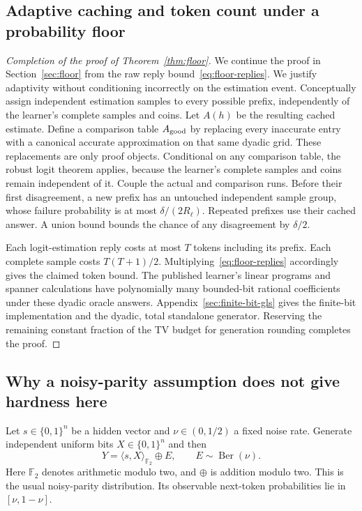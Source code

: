 \documentclass[11pt]{article}
\newcommand{\Ber}{\operatorname{Ber}}
\theoremstyle{definition}
\theoremstyle{remark}
\begin{document}
\subsection{Adaptive caching and token count under a probability floor}\label{sec:floor-completion}

\begin{proof}[Completion of the proof of Theorem~\ref{thm:floor}]
We continue the proof in Section~\ref{sec:floor} from the raw reply bound~\eqref{eq:floor-replies}.
We justify adaptivity without conditioning incorrectly on the estimation event. Conceptually assign independent estimation samples to every possible prefix, independently of the learner's complete samples and coins. Let $A(h)$ be the resulting cached estimate. Define a comparison table $A_{\rm good}$ by replacing every inaccurate entry with a canonical accurate approximation on that same dyadic grid. These replacements are only proof objects. Conditional on any comparison table, the robust logit theorem applies, because the learner's complete samples and coins remain independent of it. Couple the actual and comparison runs. Before their first disagreement, a new prefix has an untouched independent sample group, whose failure probability is at most $\delta/(2R_\ell)$. Repeated prefixes use their cached answer. A union bound bounds the chance of any disagreement by $\delta/2$.

Each logit-estimation reply costs at most $T$ tokens including its prefix. Each complete sample costs $T(T+1)/2$. Multiplying~\eqref{eq:floor-replies} accordingly gives the claimed token bound. The published learner's linear programs and spanner calculations have polynomially many bounded-bit rational coefficients under these dyadic oracle answers. Appendix~\ref{sec:finite-bit-gls} gives the finite-bit implementation and the dyadic, total standalone generator. Reserving the remaining constant fraction of the TV budget for generation rounding completes the proof.
\end{proof}

\subsection{Why a noisy-parity assumption does not give hardness here}\label{sec:parity}

Let $s\in\{0,1\}^n$ be a hidden vector and $\nu\in(0,1/2)$ a fixed noise rate. Generate independent uniform bits $X\in\{0,1\}^n$ and then
\[
Y=\langle s,X\rangle_{\mathbb F_2}\oplus E,
\qquad E\sim\Ber(\nu).
\]
Here $\mathbb F_2$ denotes arithmetic modulo two, and $\oplus$ is addition modulo two. This is the usual noisy-parity distribution. Its observable next-token probabilities lie in $[\nu,1-\nu]$.
\end{document}
